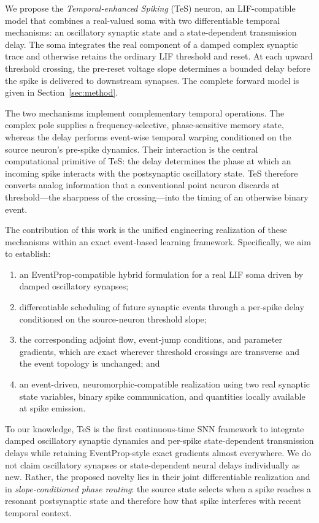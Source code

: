 We propose the \emph{Temporal-enhanced Spiking} (TeS) neuron, an LIF-compatible model that combines a real-valued soma with two differentiable temporal mechanisms: an oscillatory synaptic state and a state-dependent transmission delay. The soma integrates the real component of a damped complex synaptic trace and otherwise retains the ordinary LIF threshold and reset. At each upward threshold crossing, the pre-reset voltage slope determines a bounded delay before the spike is delivered to downstream synapses. The complete forward model is given in Section~\ref{sec:method}.

The two mechanisms implement complementary temporal operations. The complex pole supplies a frequency-selective, phase-sensitive memory state, whereas the delay performs event-wise temporal warping conditioned on the source neuron's pre-spike dynamics. Their interaction is the central computational primitive of TeS: the delay determines the phase at which an incoming spike interacts with the postsynaptic oscillatory state. TeS therefore converts analog information that a conventional point neuron discards at threshold---the sharpness of the crossing---into the timing of an otherwise binary event.

The contribution of this work is the unified engineering realization of these mechanisms within an exact event-based learning framework. Specifically, we aim to establish:
\begin{enumerate}
    \item an EventProp-compatible hybrid formulation for a real LIF soma driven by damped oscillatory synapses;
    \item differentiable scheduling of future synaptic events through a per-spike delay conditioned on the source-neuron threshold slope;
    \item the corresponding adjoint flow, event-jump conditions, and parameter gradients, which are exact wherever threshold crossings are transverse and the event topology is unchanged; and
    \item an event-driven, neuromorphic-compatible realization using two real synaptic state variables, binary spike communication, and quantities locally available at spike emission.
\end{enumerate}
To our knowledge, TeS is the first continuous-time SNN framework to integrate damped oscillatory synaptic dynamics and per-spike state-dependent transmission delays while retaining EventProp-style exact gradients almost everywhere. We do not claim oscillatory synapses or state-dependent neural delays individually as new. Rather, the proposed novelty lies in their joint differentiable realization and in \emph{slope-conditioned phase routing}: the source state selects when a spike reaches a resonant postsynaptic state and therefore how that spike interferes with recent temporal context.

